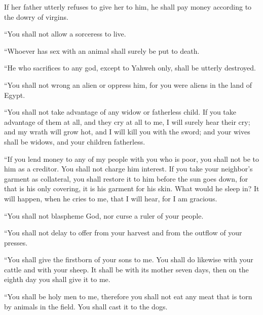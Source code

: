 {If her father utterly refuses to give her to him, he shall pay money according to the dowry of virgins.
\par }{\PP {}“You shall not allow a sorceress to live.
\par }{\PP {}“Whoever has sex with an animal shall surely be put to death.
\par }{\PP {}“He who sacrifices to any god, except to Yahweh only, shall be utterly destroyed.
\par }{\PP {}“You shall not wrong an alien or oppress him, for you were aliens in the land of Egypt.
\par }{\PP {}“You shall not take advantage of any widow or fatherless child.
If you take advantage of them at all, and they cry at all to me, I will surely hear their cry;
and my wrath will grow hot, and I will kill you with the sword; and your wives shall be widows, and your children fatherless.
\par }{\PP {}“If you lend money to any of my people with you who is poor, you shall not be to him as a creditor. You shall not charge him interest.
If you take your neighbor’s garment as collateral, you shall restore it to him before the sun goes down,
for that is his only covering, it is his garment for his skin. What would he sleep in? It will happen, when he cries to me, that I will hear, for I am gracious.
\par }{\PP {}“You shall not blaspheme God, nor curse a ruler of your people.
\par }{\PP {}“You shall not delay to offer from your harvest and from the outflow of your presses.
\par }{\PP “You shall give the firstborn of your sons to me.
You shall do likewise with your cattle and with your sheep. It shall be with its mother seven days, then on the eighth day you shall give it to me.
\par }{\PP {}“You shall be holy men to me, therefore you shall not eat any meat that is torn by animals in the field. You shall cast it to the dogs.

}
